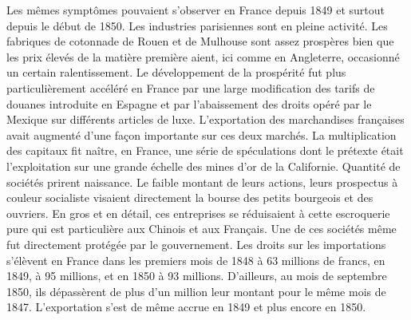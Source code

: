 \documentclass[twoside]{book} %
\newcommand\chaptercont{} %
\begin{document}
\chaptercont
\noindent Les mêmes symptômes pouvaient s’observer en France depuis 1849 et surtout depuis le début de 1850. Les industries parisiennes sont en pleine activité. Les fabriques de cotonnade de Rouen et de Mulhouse sont assez prospères bien que les prix élevés de la matière première aient, ici comme en Angleterre, occasionné un certain ralentissement. Le développement de la prospérité fut plus particulièrement accéléré en France par une large modification des tarifs de douanes introduite en Espagne et par l’abaissement des droits opéré par le Mexique sur différents articles de luxe. L’exportation des marchandises françaises avait augmenté d’une façon importante sur ces deux marchés. La multiplication des capitaux fit naître, en France, une série de spéculations dont le prétexte était l’exploitation sur une grande échelle des mines d’or de la Californie. Quantité de sociétés prirent naissance. Le faible montant de leurs actions, leurs prospectus à couleur socialiste visaient directement la bourse des petits bourgeois et des ouvriers. En gros et en détail, ces entreprises se réduisaient à cette escroquerie pure qui est particulière aux Chinois et aux Français. Une de ces sociétés même fut directement protégée par le gouvernement. Les droits sur les importations s’élèvent en France dans les premiers mois de 1848 à 63 millions de francs, en 1849, à 95 millions, et en 1850 à 93 millions. D’ailleurs, au mois de septembre 1850, ils dépassèrent de plus d’un million leur montant pour le même mois de 1847. L’exportation s’est de même accrue en 1849 et plus encore en 1850.\par
\end{document}
